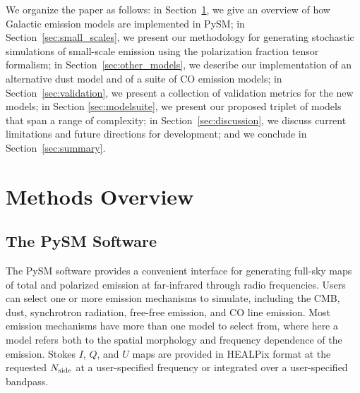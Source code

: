 \documentclass[twocolumn]{aastex631}
\begin{document}
We organize the paper as follows: in Section~\ref{sec:methods}, we give an overview of how Galactic emission models are implemented in PySM; in Section~\ref{sec:small_scales}, we present our methodology for generating stochastic simulations of small-scale emission using the polarization fraction tensor formalism; in Section~\ref{sec:other_models}, we describe our implementation of an alternative dust model and of a suite of CO emission models; in Section~\ref{sec:validation}, we present a collection of validation metrics for the new models; in Section \ref{sec:modelsuite}, we present our proposed triplet of models that span a range of complexity; in Section~\ref{sec:discussion}, we discuss current limitations and future directions for development; and we conclude in Section~\ref{sec:summary}.

\section{Methods Overview} \label{sec:methods}

\subsection{The PySM Software}

The PySM software provides a convenient interface for generating full-sky maps of total and polarized emission at far-infrared through radio frequencies. Users can select one or more emission mechanisms to simulate, including the CMB, dust, synchrotron radiation, free-free emission, and CO line emission. Most emission mechanisms have more than one model to select from, where here a model refers both to the spatial morphology and frequency dependence of the emission. Stokes $I$, $Q$, and $U$ maps are provided in HEALPix \citep{Gorski:2005} format at the requested $N_{\rm side}$ at a user-specified frequency or integrated over a user-specified bandpass.
\end{document}

